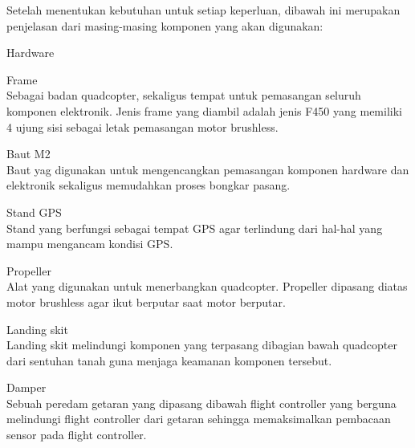 Setelah menentukan kebutuhan untuk setiap keperluan, dibawah ini merupakan penjelasan dari masing-masing komponen yang akan digunakan:

\begin{packed_enum}
	\item Hardware
	\begin{packed_item}
		\item[a.] Frame
		\\ Sebagai badan quadcopter, sekaligus tempat untuk pemasangan seluruh komponen elektronik. Jenis frame yang diambil adalah jenis F450 yang memiliki 4 ujung sisi sebagai letak pemasangan motor brushless.
		\item [b.] Baut M2
		\\ Baut yag digunakan untuk mengencangkan pemasangan komponen hardware dan elektronik sekaligus memudahkan proses bongkar pasang.
		\item [c.] Stand GPS
		\\ Stand yang berfungsi sebagai tempat GPS agar terlindung dari hal-hal yang mampu mengancam kondisi GPS.
		\item [d.] Propeller
		\\ Alat yang digunakan untuk menerbangkan quadcopter. Propeller dipasang diatas motor brushless agar ikut berputar saat motor berputar.
		\item [e.] Landing skit
		\\ Landing skit melindungi komponen yang terpasang dibagian bawah quadcopter dari sentuhan tanah guna menjaga keamanan komponen tersebut.
		\item [f.] Damper
		\\ Sebuah peredam getaran yang dipasang dibawah flight controller yang berguna melindungi flight controller dari getaran sehingga memaksimalkan pembacaan sensor pada flight controller.
	\end{packed_item}
	

\end{packed_enum}
